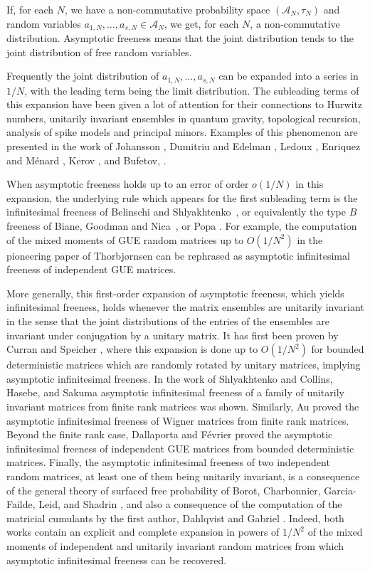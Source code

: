 \documentclass[11pt]{amsart}
\theoremstyle{definition}
\numberwithin{theorem}{section}
\newcommand{\cA}{\mathcal{A}}
\newcommand{\sN}{{\scriptscriptstyle N}}
\begin{document}
If, for each $N$, we have a non-commutative probability
space $(\cA_\sN, \tau_\sN)$ and random variables $a_{1,
  \sN}, \dots, a_{s, \sN} \in \cA_\sN$, we get, for each
$N$, a non-commutative distribution. Asymptotic freeness
means that the joint distribution tends to the joint
distribution of free random variables.

Frequently the joint distribution of $a_{1, \sN}, \dots,
a_{s, \sN} $ can be expanded into a series in $1/N$, with
the leading term being the limit distribution. The
subleading terms of this expansion have been given a lot of
attention for their connections to Hurwitz numbers,
unitarily invariant ensembles in quantum gravity,
topological recursion, analysis of spike models and
principal minors. Examples of this phenomenon are presented
in the work of Johansson \cite{kj}, Dumitriu and Edelman
\cite{de}, Ledoux \cite{l}, Enriquez and Ménard \cite{em},
Kerov \cite{k}, and Bufetov, \cite{buf, bz}.

When asymptotic freeness holds up to an error of order
$o(1/N)$ in this expansion, the underlying rule which
appears for the first subleading term is the infinitesimal
freeness of Belinschi and Shlyakhtenko~\cite{bs}, or
equivalently the type $B$ freeness of Biane, Goodman and
Nica~\cite{bgn}, or Popa \cite{p}. For example, the
computation of the mixed moments of GUE random matrices up
to $O(1/N^2)$ in the pioneering paper of Thorbjørnsen
\cite{tho} can be rephrased as asymptotic infinitesimal
freeness of independent GUE matrices.

More generally, this first-order expansion of asymptotic
freeness, which yields infinitesimal freeness, holds
whenever the matrix ensembles are unitarily invariant in the
sense that the joint distributions of the entries of the
ensembles are invariant under conjugation by a unitary
matrix. It has first been proven by Curran and Speicher
\cite[Theorem 5.11]{cs}, where this expansion is done up to
$O(1/N^2)$ for bounded deterministic matrices which are
randomly rotated by unitary matrices, implying asymptotic
infinitesimal freeness.  In the work of Shlyakhtenko
\cite{s} and Collins, Hasebe, and Sakuma \cite{chs}
asymptotic infinitesimal freeness of a family of unitarily
invariant matrices from finite rank matrices was
shown. Similarly, Au \cite{a} proved the asymptotic
infinitesimal freeness of Wigner matrices from finite rank
matrices. Beyond the finite rank case, Dallaporta and
Février \cite{df} proved the asymptotic infinitesimal
freeness of independent GUE matrices from bounded
deterministic matrices. Finally, the asymptotic
infinitesimal freeness of two independent random matrices,
at least one of them being unitarily invariant, is a
consequence of the general theory of surfaced free
probability of Borot, Charbonnier, Garcia-Failde, Leid, and
Shadrin \cite{bcgls}, and also a consequence of the
computation of the matricial cumulants by the first author,
Dahlqvist and Gabriel \cite{cdg}. Indeed, both works contain
an explicit and complete expansion in powers of $1/N^{2}$ of
the mixed moments of independent and unitarily invariant
random matrices from which asymptotic infinitesimal freeness
can be recovered.
\end{document}
